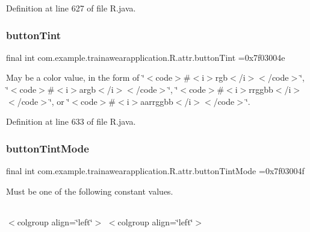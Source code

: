 Definition at line 627 of file R.\+java.

\mbox{\label{classcom_1_1example_1_1trainawearapplication_1_1_r_1_1attr_a93dbde8fcdac146bfccfea120ff2f860}} 
\subsubsection{\texorpdfstring{buttonTint}{buttonTint}}
{\footnotesize\ttfamily final int com.\+example.\+trainawearapplication.\+R.\+attr.\+button\+Tint =0x7f03004e\hspace{0.3cm}{\ttfamily [static]}}

May be a color value, in the form of \char`\"{}$<$code$>$\#$<$i$>$rgb$<$/i$>$$<$/code$>$\char`\"{}, \char`\"{}$<$code$>$\#$<$i$>$argb$<$/i$>$$<$/code$>$\char`\"{}, \char`\"{}$<$code$>$\#$<$i$>$rrggbb$<$/i$>$$<$/code$>$\char`\"{}, or \char`\"{}$<$code$>$\#$<$i$>$aarrggbb$<$/i$>$$<$/code$>$\char`\"{}. 

Definition at line 633 of file R.\+java.

\mbox{\label{classcom_1_1example_1_1trainawearapplication_1_1_r_1_1attr_a73b929dd4b29a09704fd1b2ebd770ac7}} 
\subsubsection{\texorpdfstring{buttonTintMode}{buttonTintMode}}
{\footnotesize\ttfamily final int com.\+example.\+trainawearapplication.\+R.\+attr.\+button\+Tint\+Mode =0x7f03004f\hspace{0.3cm}{\ttfamily [static]}}

Must be one of the following constant values.

\tabulinesep=1mm
\begin{longtabu}spread 0pt [c]{*{0}{|X[-1]}|}
\hline
\end{longtabu}
$<$colgroup align=\char`\"{}left\char`\"{}$>$ $<$colgroup align=\char`\"{}left\char`\"{}$>$ 


